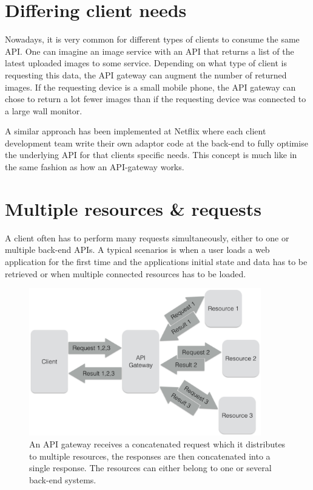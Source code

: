\documentclass{cslthse-msc}
\begin{document}
\section{Differing client needs}
Nowadays, it is very common for different types of clients to consume the same API. One can imagine an image service with an API that returns a list of the latest uploaded images to some service. Depending on what type of client is requesting this data, the API gateway can augment the number of returned images. If the requesting device is a small mobile phone, the API gateway can chose to return a lot fewer images than if the requesting device was connected to a large wall monitor.

A similar approach has been implemented at Netflix where each client development team write their own adaptor code at the back-end to fully optimise the underlying API for that clients specific needs\cite{netflix}. This concept is much like in the same fashion as how an API-gateway works.

\section{Multiple resources \& requests}
A client often has to perform many requests simultaneously, either to one or multiple back-end APIs. A typical scenarios is when a user loads a web application for the first time and the applications initial state and data has to be retrieved or when multiple connected resources has to be loaded.

\begin{figure}[H]
  \centering
    \begin{center}
      \includegraphics[width=0.9\textwidth]{images/api_gateway_concatenation.png}
    \end{center}
  \caption{An API gateway receives a concatenated request which it distributes to multiple resources, the responses are then concatenated into a single response. The resources can either belong to one or several back-end systems.}
\end{figure}
\end{document}
